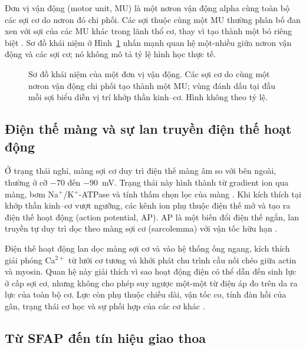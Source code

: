 Đơn vị vận động (motor unit, MU) là một nơron vận động alpha cùng toàn bộ
các sợi cơ do nơron đó chi phối. Các sợi thuộc cùng một MU thường phân bố
đan xen với sợi của các MU khác trong lãnh thổ cơ, thay vì tạo thành một
bó riêng biệt \cite{mcmanus2020analysis,campanini2022fundamental}. Sơ đồ
khái niệm ở Hình~\ref{fig:motor-unit} nhấn mạnh quan hệ một-nhiều giữa
nơron vận động và các sợi cơ; nó không mô tả tỷ lệ hình học thực tế.

\begin{figure}[htbp]
    \centering
    
    \caption{Sơ đồ khái niệm của một đơn vị vận động. Các sợi cơ do cùng
    một nơron vận động chi phối tạo thành một MU; vùng đánh dấu tại đầu
    mỗi sợi biểu diễn vị trí khớp thần kinh--cơ. Hình không theo tỷ lệ.}
    \label{fig:motor-unit}
\end{figure}

\subsection{Điện thế màng và sự lan truyền điện thế hoạt động}
\label{sec:membrane-potentials}

Ở trạng thái nghỉ, màng sợi cơ duy trì điện thế màng âm so với bên ngoài,
thường ở cỡ $-70$ đến $-90$~mV. Trạng thái này hình thành từ gradient ion
qua màng, bơm Na$^+$/K$^+$-ATPase và tính thấm chọn lọc của màng
\cite{merletti2004electromyography,mcmanus2020analysis}. Khi kích thích tại
khớp thần kinh--cơ vượt ngưỡng, các kênh ion phụ thuộc điện thế mở và tạo
ra điện thế hoạt động (action potential, AP). AP là một biến đổi điện thế
ngắn, lan truyền tự duy trì dọc theo màng sợi cơ (sarcolemma) với vận tốc
hữu hạn \cite{merletti2004electromyography}.

Điện thế hoạt động lan dọc màng sợi cơ và vào hệ thống ống ngang, kích
thích giải phóng Ca$^{2+}$ từ lưới cơ tương và khởi phát chu trình cầu nối
chéo giữa actin và myosin. Quan hệ
này giải thích vì sao hoạt động điện có thể dẫn đến sinh lực ở cấp sợi cơ,
nhưng không cho phép suy ngược một-một từ điện áp đo trên da ra lực của
toàn bộ cơ. Lực còn phụ thuộc chiều dài, vận tốc co, tính đàn hồi của gân,
trạng thái cơ học và sự phối hợp của các cơ khác
\cite{mcmanus2020analysis,enoka2008muscle}.

\subsection{Từ SFAP đến tín hiệu giao thoa}
\label{sec:sfap-to-interference}

